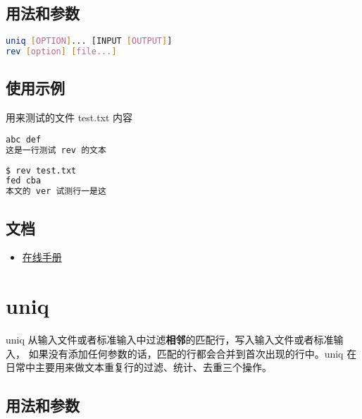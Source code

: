 \subsection{用法和参数}

\begin{lstlisting}[language=bash, numbersep=1em, numberstyle=\footnotesize , breaklines=true]
uniq [OPTION]... [INPUT [OUTPUT]]
rev [option] [file...]
\end{lstlisting}

\subsection{使用示例}

用来测试的文件 test.txt 内容
\begin{lstlisting}[language=bash, numbersep=1em, numberstyle=\footnotesize , breaklines=true]
abc def
这是一行测试 rev 的文本
\end{lstlisting}

\begin{lstlisting}[language=bash, numbersep=1em, numberstyle=\footnotesize , breaklines=true]
$ rev test.txt
fed cba
本文的 ver 试测行一是这
\end{lstlisting}


\subsection{文档}
\begin{itemize}
\item \href{https://www.man7.org/linux/man-pages/man1/rev.1.html}{在线手册}
\end{itemize}

\newpage
\section{uniq}

uniq 从输入文件或者标准输入中过滤\textbf{相邻}的匹配行，写入输入文件或者标准输入，
如果没有添加任何参数的话，匹配的行都会合并到首次出现的行中。uniq 在日常中主要用来做文本重复行的过滤、统计、去重三个操作。


\subsection{用法和参数}

